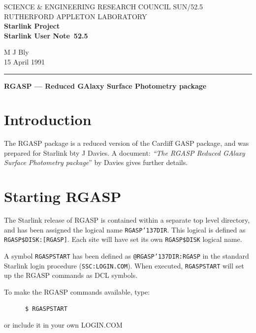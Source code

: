 \documentclass{article}
\newcommand{\stardoccategory}  {Starlink User Note}
\newcommand{\stardocinitials}  {SUN}
\newcommand{\stardocnumber}    {52.5}
\newcommand{\stardocauthors}   {M J Bly}
\newcommand{\stardocdate}      {15 April 1991}
\newcommand{\stardoctitle}     {RGASP --- Reduced GAlaxy Surface Photometry
				package}
\newcommand{\stardocname}{\stardocinitials /\stardocnumber}
\renewcommand{\_}{{\tt\char'137}}     %
\begin{document}
\thispagestyle{empty}
SCIENCE \& ENGINEERING RESEARCH COUNCIL \hfill \stardocname\\
RUTHERFORD APPLETON LABORATORY\\
{\large\bf Starlink Project\\}
{\large\bf \stardoccategory\ \stardocnumber}
\begin{flushright}
\stardocauthors\\
\stardocdate
\end{flushright}
\vspace{-4mm}
\rule{\textwidth}{0.5mm}
\vspace{5mm}
\begin{center}
{\Large\bf \stardoctitle}
\end{center}
\vspace{5mm}


\section{Introduction}

The RGASP package is a reduced version of the Cardiff GASP package, and was
prepared for Starlink bty J Davies. A document: {\it ``The RGASP Reduced GAlaxy
Surface Photometry package}''\/ by Davies gives further details.

\section{Starting RGASP}

The Starlink release of RGASP is contained within a separate top level
directory, and has been assigned the logical name {\tt RGASP\_DIR}. This logical
is defined as {\tt RGASP\$DISK:[RGASP]}. Each site will have set its own
{\tt RGASP\$DISK} logical name.

A symbol {\tt RGASPSTART} has been defined as {\tt @RGASP\_DIR:RGASP} in the
standard Starlink login procedure ({\tt SSC:LOGIN.COM}). When executed,
{\tt RGASPSTART} will set up the RGASP commands as DCL symbols.

To make the RGASP commands available, type:
\begin{verbatim}
      $ RGASPSTART
\end{verbatim}
or include it in your own LOGIN.COM
\end{document}

